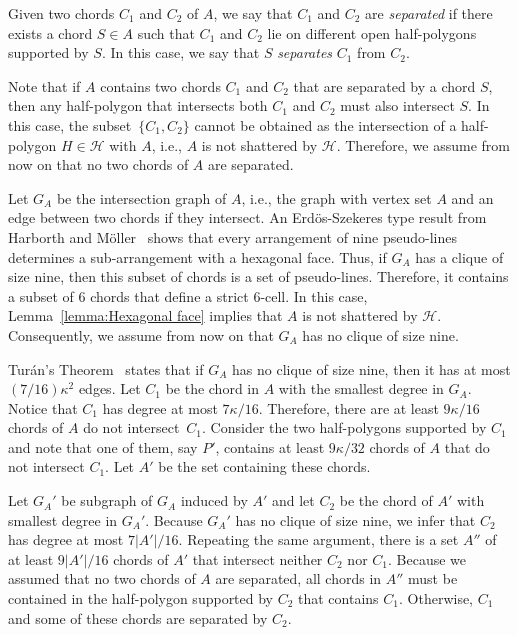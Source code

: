 \documentclass[a4paper]{article}
\newcommand{\G}{\ensuremath{G_{A}}}
\begin{document}
Given two chords $C_1$ and $C_2$ of $A$, we say that $C_1$ and $C_2$ are \emph{separated} if there exists a chord $S\in A$ such that $C_1$ and $C_2$ lie on different open half-polygons supported by $S$. In this case, we say that $S$ \emph{separates} $C_1$ from $C_2$.

Note that if $A$ contains two chords $C_1$ and $C_2$ that are separated by a chord $S$, then any half-polygon that intersects both $C_1$ and $C_2$ must also intersect $S$. In this case, the subset~$\{C_1, C_2\}$ cannot be obtained as the intersection of a half-polygon $H\in \mathcal H$ with $A$, i.e., $A$ is not shattered by $\mathcal H$. 
Therefore, we assume from now on that no two chords of $A$ are separated.

Let $\G$ be the intersection graph of $A$, i.e., the graph with vertex set $A$ and an edge between two chords if they intersect. An Erd\"os-Szekeres type result from Harborth and M\"oller~\cite{harborth1993esther} shows that every arrangement of nine pseudo-lines determines a sub-arrangement with a hexagonal face.
Thus, if $\G$ has a clique of size nine, then this subset of chords is a set of pseudo-lines. Therefore, it contains a subset of 6 chords that define a strict $6$-cell. 
In this case, Lemma~\ref{lemma:Hexagonal face} implies that $A$ is not shattered by $\mathcal H$.
Consequently, we assume from now on that $\G$ has no clique of size nine. 

Tur\'an's Theorem~\cite{turan1941extremal} states that if $\G$ has no clique of size nine, then it has at most $(7/16)\kappa^2$ edges.
Let $C_1$ be the chord in $A$ with the smallest degree in $\G$. Notice that $C_1$ has degree at most $7 \kappa/16$.
Therefore, there are at least $9 \kappa/16$ chords of $A$ do not intersect~$C_1$. 
Consider the two half-polygons supported by $C_1$ and note that one of them, say $P'$, contains at least $9 \kappa/32$ chords of $A$ that do not intersect $C_1$. Let $A'$ be the set containing these chords.

Let $\G'$ be subgraph of $\G$ induced by $A'$ and let $C_2$ be the chord of $A'$ with smallest degree in $\G'$.
Because $\G'$ has no clique of size nine, we infer that $C_2$ has degree at most $7|A'|/16$.
Repeating the same argument, there is a set $A''$ of at least $9 |A'| /16$ chords of $A'$ that intersect neither $C_2$ nor $C_1$.
Because we assumed that no two chords of $A$ are separated, all chords in $A''$ must be contained in the half-polygon supported by $C_2$ that contains $C_1$. Otherwise, $C_1$ and some of these chords are separated by $C_2$.
\end{document}
